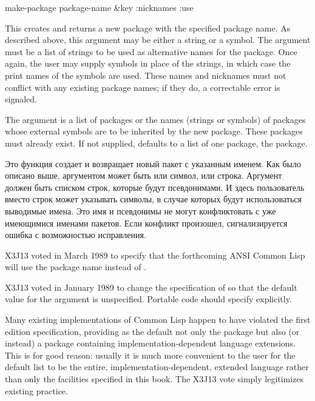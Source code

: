 \begin{defun}[Function]
make-package package-name &key :nicknames :use

This creates and returns a new package with the specified package name.  As
described above, this argument may be either a string or a symbol.  The
 argument must be a list of strings to be used as
alternative names for the package.  Once again, the user may supply
symbols in place of the strings, in which case the print names of the
symbols are used.  These names and nicknames must not conflict with
any existing package names; if they do, a correctable error is
signaled.

The  argument is a list of packages or the names (strings or
symbols) of packages whose external symbols are to be inherited by the
new package.  These packages must already exist.  If not supplied,
 defaults to a list of one package, the  package.

Это функция создает и возвращает новый пакет с указанным именем. Как было
описано выше, аргументом может быть или символ, или строка. Аргумент
 должен быть списком строк, которые будут псевдонимами. И здесь
пользователь вместо строк может указывать символы, в случае которых будут
использоваться выводимые имена. Это имя и псевдонимы не могут конфликтовать с
уже имеющимися именами пакетов. Если конфликт произошел, сигнализируется ошибка
с возможностью исправления.

\begin{newer}
X3J13 voted in March 1989  to specify that
the forthcoming ANSI Common Lisp will use the package name 
instead of .
\end{newer}

\begin{new}
X3J13 voted in January 1989
to change the specification of  so that the default value
for the  argument is unspecified.  Portable code should
specify  explicitly.

\beforenoterule
\begin{rationale}
Many existing implementations of Common Lisp happen to have violated
the first edition specification, providing as the default not only
the  package but also (or instead) a package containing
implementation-dependent language extensions.
This is for good reason: usually it is much
more convenient to the user for the default  list to be
the entire, implementation-dependent, extended language rather
than only the facilities specified in this book.  The X3J13 vote
simply legitimizes existing practice.
\end{rationale}
\afternoterule
\end{new}
\end{defun}


